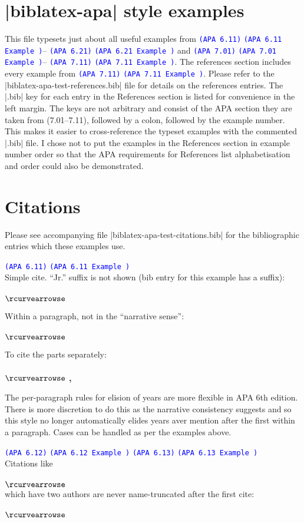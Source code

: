 \documentclass{article}
\newcommand\apa[2][]{\ifthenelse{\equal{#1}{}}%
                       {\textcolor{blue}{\texttt{(APA #2)}}}%
                       {\textcolor{blue}{\texttt{(APA #2 Example #1)}}}}
\def\apaex#1{\hbox{\hspace{-4em}\texttt{\small \detokenize{#1}}}\\ $\rcurvearrowse$ \textbf{#1}}
\begin{document}
\section*{|biblatex-apa| style examples}

This file typesets just about all useful examples from
\apa{6.11}--\apa{6.21} and \apa{7.01}--\apa{7.11}. The references section
includes every example from \apa{7.11}. Please refer to the
|biblatex-apa-test-references.bib| file for details on the references
entries. The |.bib| key for each entry in the References section is listed
for convenience in the left margin. The keys are not arbitrary and consist
of the APA section they are taken from (7.01--7.11), followed by a colon,
followed by the example number. This makes it easier to cross-reference
the typeset examples with the commented |.bib| file. I chose not to put the
examples in the References section in example number order so that the APA
requirements for References list alphabetisation and order could also be
demonstrated.

\section*{Citations}

\noindent Please see accompanying file |biblatex-apa-test-citations.bib|
for the bibliographic entries which these examples use.

\noindent\apa{6.11}\\
Simple cite. ``Jr.'' suffix is not shown (bib entry for this example has a suffix):\\
\apaex{\textcite{6.11}}

\noindent Within a paragraph, not in the ``narrative sense'':\\
\apaex{\parencite{6.11}}

\noindent To cite the parts separately:\\
\apaex{\citeyear{6.11}, \citeauthor{6.11}}

\noindent The per-paragraph rules for elision of years are more flexible in
APA 6th edition. There is more discretion to do this as the narrative
consistency suggests and so this style no longer automatically elides years
aver mention after the first within a paragraph. Cases can be handled as
per the examples above.

\noindent\apa{6.12} \apa{6.13}\\
Citations like\\
\apaex{\textcite{6.12a}}\\
which have two authors are never name-truncated after the first cite:\\
\apaex{\textcite{6.12a}}
\end{document}
